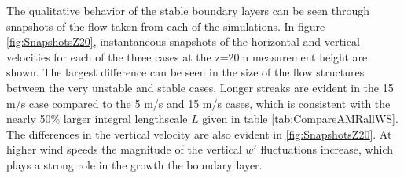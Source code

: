 The qualitative behavior of the stable boundary layers can be seen
through snapshots of the flow taken from each of the simulations.  In
figure \ref{fig:SnapshotsZ20}, instantaneous snapshots of the
horizontal and vertical velocities for each of the three cases at the
z=20m measurement height are shown.  The largest difference can be
seen in the size of the flow structures between the very unstable and
stable cases.  Longer streaks are evident in the 15 m/s case compared
to the 5 m/s and 15 m/s cases, which is consistent with the nearly
50\% larger integral lengthscale $L$ given in table
\ref{tab:CompareAMRallWS}.  The differences in the vertical velocity
are also evident in \ref{fig:SnapshotsZ20}.  At higher wind speeds the
magnitude of the vertical $w'$ fluctuations increase, which plays a
strong role in the growth the boundary layer.

